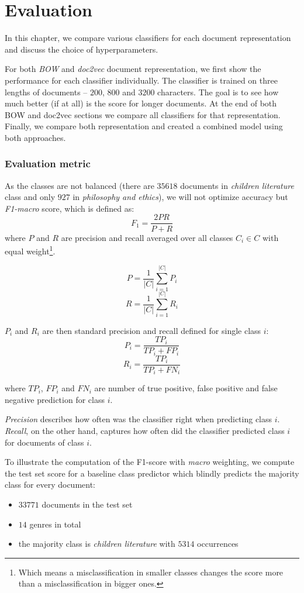 \chapter{Evaluation}

In this chapter, we compare various classifiers for each document representation and discuss the choice of hyperparameters.

For both \textit{BOW} and \textit{doc2vec} document representation, we first show the performance for each classifier individually. The classifier is trained on three lengths of documents -- $200$, $800$ and $3200$ characters. The goal is to see how much better (if at all) is the score for longer documents. At the end of both BOW and doc2vec sections we compare all classifiers for that representation. Finally, we compare both representation and created a combined model using both approaches.


\subsection{Evaluation metric}
As the classes are not balanced (there are $35618$ documents in \textit{children literature} class and only $927$ in \textit{philosophy and ethics}), we will not optimize accuracy but \textit{F1-macro} score, which is defined as:
$$ F_1 = \frac{2PR}{P+R}$$
where $P$ and $R$ are precision and recall averaged over all classes $C_i \in C$ with equal weight\footnote{Which means a misclassification in smaller classes changes the score more than a misclassification in bigger ones.}.

$$P = \frac{1}{|C|}\sum_{i=1}^{|C|}P_i$$
$$R = \frac{1}{|C|}\sum_{i=1}^{|C|}R_i$$

$P_i$ and $R_i$ are then standard precision and recall defined for single class $i$:
$$P_i = \frac{TP_i}{TP_i + FP_i}$$
$$R_i = \frac{TP_i}{TP_i + FN_i}$$

where $TP_i$, $FP_i$ and $FN_i$ are number of true positive, false positive and false negative prediction for class $i$.

\textit{Precision} describes how often was the classifier right when predicting class $i$. \textit{Recall}, on the other hand, captures how often did the classifier predicted class $i$ for documents of class $i$.

To illustrate the computation of the F1-score with \textit{macro} weighting, we compute the test set score for a baseline class predictor which blindly predicts the majority class for every document:
\begin{itemize}
	\item $33771$ documents in the test set
	\item $14$ genres in total
	\item the majority class is \textit{children literature} with $5314$ occurrences
\end{itemize}

